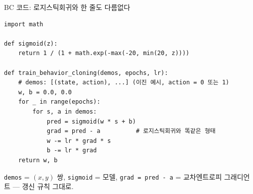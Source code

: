 \begin{frame}[fragile]{BC 코드: 로지스틱회귀와 한 줄도 다름없다}
  \begin{lstlisting}
import math

def sigmoid(z):
    return 1 / (1 + math.exp(-max(-20, min(20, z))))

def train_behavior_cloning(demos, epochs, lr):
    # demos: [(state, action), ...] (이진 예시, action = 0 또는 1)
    w, b = 0.0, 0.0
    for _ in range(epochs):
        for s, a in demos:
            pred = sigmoid(w * s + b)
            grad = pred - a          # 로지스틱회귀와 똑같은 형태
            w -= lr * grad * s
            b -= lr * grad
    return w, b
  \end{lstlisting}
  {\footnotesize \texttt{demos} = $(x,y)$ 쌍, \texttt{sigmoid} = 모델,
  \texttt{grad = pred - a} = 교차엔트로피 그래디언트 — 갱신 규칙 그대로.
  }
\end{frame}
